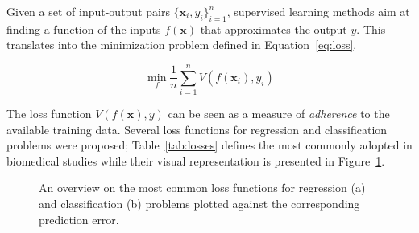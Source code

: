 
    Given a set of input-output pairs $\{\bm{x}_i, y_i\}_{i=1}^n$, supervised learning methods aim at finding a function of the inputs $f(\bm{x})$ that approximates the output $y$. This translates into the minimization problem defined in Equation~\eqref{eq:loss}.

    \begin{equation}\label{eq:loss}
      \min_f \frac{1}{n}\sum_{i=1}^n V(f(\bm{x}_i),y_i) %
    \end{equation}

    The loss function $V(f(\bm{x}),y)$ can be seen as a measure of \textit{adherence} to the available training data. Several loss functions for regression and classification problems were proposed; Table~\ref{tab:losses} defines the most commonly adopted in biomedical studies while their visual representation is presented in Figure~\ref{fig:loss}. 
    
    \begin{figure}[!h]
    	\centering
    	\caption{An overview on the most common loss functions for regression (a) and classification (b) problems plotted against the corresponding prediction error.}\label{fig:loss}
    \end{figure}
    

